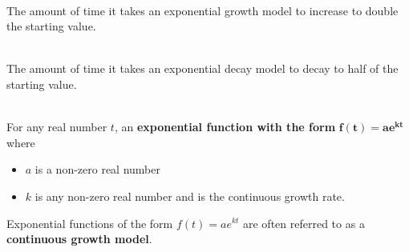 \begin{myDefinition}~\\[0.5mm]
The amount of time it takes an exponential growth model to increase to double the starting value.
\end{myDefinition}

\begin{myDefinition}~\\[0.5mm]
The amount of time it takes an exponential decay model to decay to half of the starting value.
\end{myDefinition}


\begin{myDefinition}[Exponential Function of the Form $\boldsymbol{f(t)=ae^{kt}}$:]~\\[0.5mm]
For any real number $t$, an {\bf exponential function with the form} $\boldsymbol{f(t) = a e^{kt}}$ where
	\begin{itemize}
	\setlength{\itemsep}{0in}
		\item $a$ is a non-zero real number
		\item $k$ is any non-zero real number and is the continuous growth rate.
	\end{itemize}
Exponential functions of the form $f(t)=ae^{kt}$ are often referred to as a {\bf continuous growth model}.  
\end{myDefinition}


